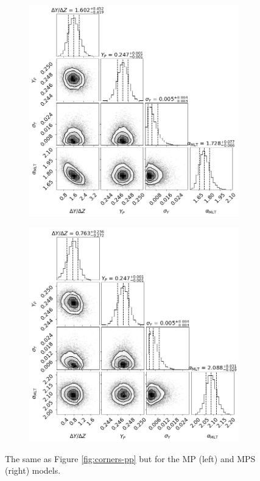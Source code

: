 \documentclass[a4paper,fleqn,usenatbib]{mnras}
\begin{document}
\begin{figure}
    \begin{subfigure}[b]{.5\linewidth}
        \centering
        \includegraphics[width=\textwidth]{figures/corner_plot_mp.png}
    \end{subfigure}%
    \begin{subfigure}[b]{.5\linewidth}
        \centering
        \includegraphics[width=\textwidth]{figures/corner_plot_mps.png}
    \end{subfigure}
    \caption{The same as Figure \ref{fig:corners-pp} but for the MP (left) and MPS (right) models.}
    \label{fig:corners-mp}
\end{figure} 
\end{document}
